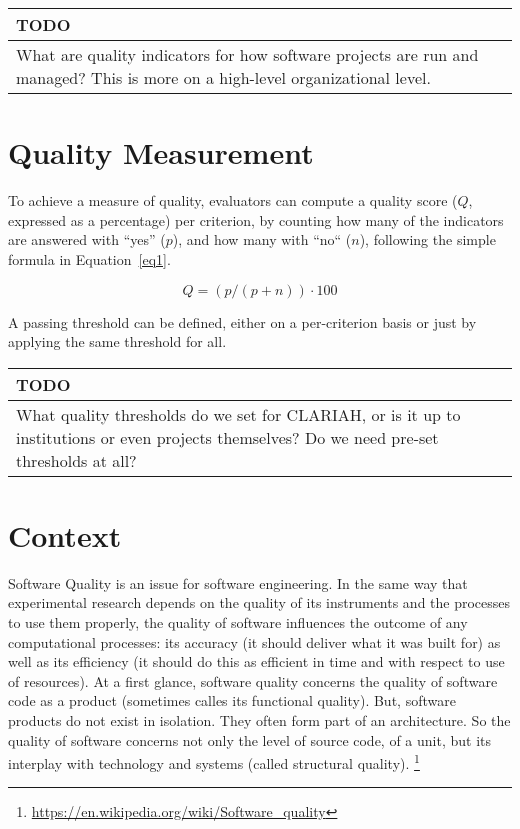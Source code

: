 \documentclass[a4paper,11pt]{article}
\newenvironment{TODO}{
\begin{center}
    \begin{tabular}[h!]{|p{0.8\textwidth}|}
    \hline
    {\bf TODO}\\\hline}
{   \\\hline
    \end{tabular}
\end{center}}
\begin{document}



\begin{TODO} 
What are quality indicators for how software projects are run and
managed? This is more on a high-level organizational level.
\end{TODO}

\section{Quality Measurement}

To achieve a measure of quality, evaluators can compute a quality score ($Q$,
expressed as a percentage) per criterion, by counting how many of the
indicators are answered with ``yes'' ($p$), and how many with ``no`` ($n$),
following the simple formula in Equation~\ref{eq1}.

\begin{equation}
\label{eq1}
Q = (p / (p + n)) \cdot 100
\end{equation}

A passing threshold can be defined, either on a per-criterion basis or just
by applying the same threshold for all. 

\begin{TODO}
What quality thresholds do we set for CLARIAH, or is it up
to institutions or even projects themselves? Do we need pre-set thresholds at
all?
\end{TODO}

\section{Context}

Software Quality is an issue for software engineering. In the same way that
experimental research depends on the quality of its instruments and the
processes to use them properly, the quality of software influences the outcome
of any computational processes: its accuracy (it should deliver what it
was built for) as well as its efficiency (it should do this as efficient in
time and with respect to use of resources). At a first glance, software
quality concerns the quality of software code as a product (sometimes
calles its functional quality). But, software products do not exist in
isolation. They often form part of an architecture. So the quality of software
concerns not only the level of source code, of a unit, but its interplay
with technology and systems (called structural quality).
\footnote{\url{https://en.wikipedia.org/wiki/Software\_quality}}
\end{document}
